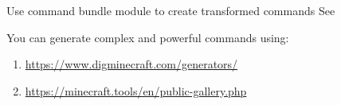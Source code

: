 \begin{tips}{Use command bundle module to create transformed commands}
    See~
\end{tips}

\clearpage
{}
You can generate complex and powerful commands using:
\begin{enumerate}
    \item \url{https://www.digminecraft.com/generators/}
    \item \url{https://minecraft.tools/en/public-gallery.php}
\end{enumerate}



